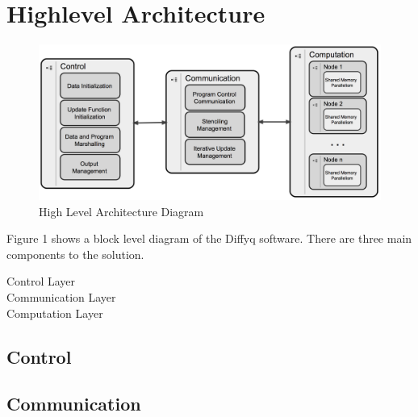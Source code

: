 \section{Highlevel Architecture}
\label{architecture}


\begin{figure}[h]
\begin{center}
\includegraphics[scale=0.4]{arch.png}
\caption{High Level Architecture Diagram}
\label{fig:arch}
\end{center}
\end{figure}


Figure 1 shows a block level diagram of the Diffyq software. There are three main components to the solution.
\begin{description}
\item[Control Layer] 
\item[Communication Layer]
\item[Computation Layer]
\end{description}

\subsection{Control}

\subsection{Communication}

